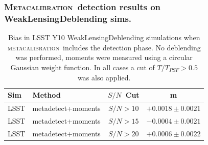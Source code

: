 \documentclass{beamer}
\newcommand{\mcal}{\textsc{metacalibration}}
\newcommand{\Mcal}{\textsc{Metacalibration}}
\newcommand{\snr}{$S/N$}
\begin{document}
\begin{frame}
    \frametitle{\Mcal\ detection results on WeakLensingDeblending sims.}

 
    \begin{table}
        \centering
        \begin{tabular}{|l|l|c|c|}
            \hline
            Sim & Method         & \snr\ Cut & m             \\
            \hline

            \hline
            {\color{brightred}LSST}    & metadetect+moments    & \snr$ > 10$ & $+0.0018 \pm 0.0021$  \\
            {\color{brightred}LSST}    & metadetect+moments    & \snr$ > 15$ & $-0.0004 \pm 0.0021$  \\
            {\color{brightred}LSST}    & metadetect+moments    & \snr$ > 20$ & $+0.0006 \pm 0.0022$  \\
            \hline

        \end{tabular}
        \caption{Bias in LSST Y10 WeakLensingDeblending simulations when \mcal\ includes
            the detection phase.  No deblending was performed, 
            moments were measured using a circular Gaussian weight function.
            In all cases a cut of $T/T_{PSF} > 0.5$ was also applied.
        \label{tab:mcal:deblending}}
    \end{table}


\end{frame}
\end{document}
